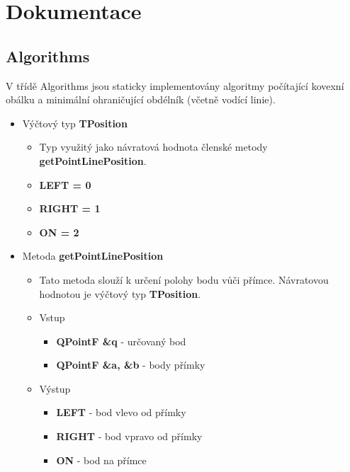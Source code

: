 \documentclass[a4paper, 12pt]{article}
\begin{document}
\clearpage

\section{Dokumentace}

\subsection{Algorithms}
V třídě Algorithms jsou staticky implementovány algoritmy počítající kovexní obálku a minimální ohraničující obdélník (včetně vodící linie).

\begin{itemize}

	\item Výčtový typ \textbf{TPosition}
		\begin{itemize}
			\item Typ využitý jako návratová hodnota členské metody \textbf{getPointLinePosition}.
			\item \textbf{LEFT = 0}
			\item \textbf{RIGHT = 1}
			\item \textbf{ON = 2}
		\end{itemize}

	\item Metoda \textbf{getPointLinePosition}
		\begin{itemize}
			\item Tato metoda slouží k určení polohy bodu vůči přímce. Návratovou hodnotou je výčtový typ \textbf{TPosition}.
			\item Vstup
				\begin{itemize}
					\item \textbf{QPointF \&q} - určovaný bod
					\item \textbf{QPointF \&a, \&b} - body přímky
				\end{itemize}
			\item Výstup
				\begin{itemize}
					\item \textbf{LEFT} - bod vlevo od přímky
					\item \textbf{RIGHT} - bod vpravo od přímky
					\item \textbf{ON} - bod na přímce
				\end{itemize}

		\end{itemize}


\end{itemize}
\end{document}
